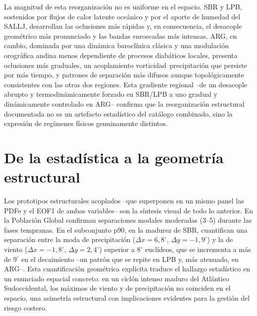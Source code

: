 La magnitud de esta reorganización no es uniforme en el espacio. SBR y LPB, sostenidos por flujos de calor latente oceánico y por el aporte de humedad del SALLJ, desarrollan las oclusiones más rápidas y, en consecuencia, el desacople geométrico más pronunciado y las bandas enroscadas más intensas. ARG, en cambio, dominada por una dinámica baroclínica clásica y una modulación orográfica andina menos dependiente de procesos diabáticos locales, presenta oclusiones más graduales, un acoplamiento vorticidad--precipitación que persiste por más tiempo, y patrones de separación más difusos aunque topológicamente consistentes con las otras dos regiones. Esta gradiente regional --de un desacople abrupto y termodinámicamente forzado en SBR/LPB a uno gradual y dinámicamente controlado en ARG-- confirma que la reorganización estructural documentada no es un artefacto estadístico del catálogo combinado, sino la expresión de regímenes físicos genuinamente distintos.

\section{De la estadística a la geometría estructural}

Los prototipos estructurales acoplados --que superponen en un mismo panel las PDFe y el EOF1 de ambas variables-- son la síntesis visual de todo lo anterior. En la Población Global confirman separaciones modales moderadas (3--5\textdegree) durante las fases tempranas. En el subconjunto p90, en la madurez de SBR, cuantifican una separación entre la moda de precipitación ($\Delta x = 6{,}8^{\circ}$, $\Delta y = -1{,}9^{\circ}$) y la de viento ($\Delta x = -1{,}8^{\circ}$, $\Delta y = 2{,}4^{\circ}$) superior a $8^{\circ}$ euclídeos, que se incrementa a más de $9^{\circ}$ en el decaimiento --un patrón que se repite en LPB y, más atenuado, en ARG--. Esta cuantificación geométrica explícita traduce el hallazgo estadístico en un enunciado espacial concreto: en un ciclón intenso maduro del Atlántico Sudoccidental, los máximos de viento y de precipitación no coinciden en el espacio, una asimetría estructural con implicaciones evidentes para la gestión del riesgo costero.
